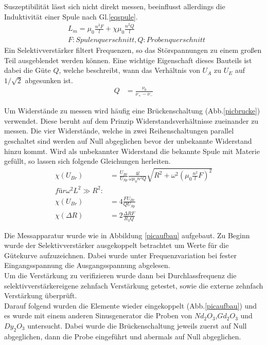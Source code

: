 Suszeptibilität lässt sich nicht direkt messen, beeinflusst allerdings die Induktivität einer
Spule nach Gl.\ref{eqspule}.
\begin{align}
&L_m=\mu_0 \frac{n^2 F}{l} + \chi \mu_0 \frac{n^2 Q}{l} \label{eqspule} \\
&F: Spulenquerschnitt, Q: Probenquerschnitt \nonumber
\end{align}
Ein Selektivverstärker filtert Frequenzen, so das Störspannungen zu einem großen Teil ausgeblendet 
werden können. Eine wichtige Eigenschaft dieses Bauteils ist dabei die Güte $Q$, welche beschreibt, 
wann das Verhältnis von $U_A$ zu $U_E$ auf $1/\sqrt{2}$ abgesunken ist.
\begin{align}
Q&=\frac{\nu_0}{\nu_+ - \nu_-} \label{eqgute}
\end{align}

\FloatBarrier
Um Widerstände zu messen wird häufig eine Brückenschaltung (Abb.\ref{picbrucke}) verwendet. Diese beruht auf dem Prinzip 
Widerstandsverhältnisse zueinander zu messen. Die vier Widerstände, welche in zwei Reihenschaltungen
parallel geschaltet sind werden auf Null abgeglichen bevor der unbekannte Widerstand hinzu kommt. 
Wird als unbekannter Widerstand die bekannte Spule mit Materie gefüllt, so lassen sich folgende Gleichungen
herleiten.
\begin{align}
\chi(U_{Br})&=\frac{U_{Br}}{U_{Sp}}\frac{4l}{\omega \mu_0 n^2 Q} \sqrt{R^2 + \omega^2 (\mu_0 \frac{n^2}{l} F)^2} \\
für \omega^2 L^2 \gg R^2 : \nonumber \\
\chi(U_{Br})&=4 \frac{F U_{Br}}{Q U_{Sp}} \label{eqchiu}\\
\chi(\Delta R)&=2 \frac{\Delta R F}{R_3 Q} \label{eqchir}
\end{align}

Die Messapparatur wurde wie in Abbildung \ref{picaufbau} aufgebaut. Zu Beginn wurde der Selektivverstärker
ausgekoppelt betrachtet um Werte für die Gütekurve aufzuzeichnen. Dabei wurde unter Frequenzvariation bei 
fester Eingangsspannung die Ausgangsspannung abgelesen. \\ 
Um die Verstärkung zu verifizieren wurde dann bei Durchlassfrequenz die selektivverstärkereigene zehnfach 
Verstärkung getestet, sowie die externe zehnfach Verstärkung überprüft.\\
Darauf folgend wurden die Elemente wieder eingekoppelt (Abb.\ref{picaufbau}) und es wurde mit einem anderen 
Sinusgenerator die Proben von $Nd_2O_3$,$Gd_2O_3$ und $Dy_2O_3$ untersucht. Dabei wurde die Brückenschaltung
jeweils zuerst auf Null abgeglichen, dann die Probe eingeführt und abermals auf Null abgeglichen.

